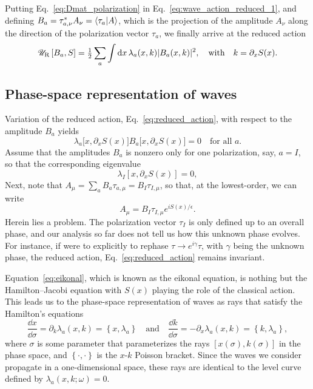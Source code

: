 Putting Eq.~\eqref{eq:Dmat_polarization} in Eq.~\eqref{eq:wave_action_reduced_1}, and defining $B_{a} = \tau_{a, \nu}^{*}A_{\nu} = \mathinner{\langle{\tau_{a}|A}\rangle}$, which is the projection of the amplitude $A_{\nu}$ along the direction of the polarization vector $\tau_{a}$, we finally arrive at the reduced action
%
\begin{equation}
  \mathscr{U}_{\text{R}}\left[B_{a}, S\right] = \tfrac{1}{2} \sum_{a} \int \mathrm{d}{x}\, \lambda_{a}(x,k) \lvert B_{a}(x, k)\rvert^{2},
  \quad\text{with}\quad
  k = \partial_{x}S(x).
  \label{eq:reduced_action}
\end{equation}

\subsection{Phase-space representation of waves}

Variation of the reduced action, Eq.~\eqref{eq:reduced_action}, with respect to the amplitude $B_{a}$ yields
%
\begin{equation}
  \lambda_{a}\big[x, \partial_{x}S(x)\big] B_{a}\big[x, \partial_{x}S(x)\big] = 0
  \quad\text{for all $a$}.
\end{equation}
%
Assume that the amplitudes $B_{a}$ is nonzero only for one polarization, say, $a = I$, so that the corresponding eigenvalue
%
\begin{equation}
  \lambda_{I}\left[x, \partial_{x}S(x)\right] = 0,
  \label{eq:eikonal}
\end{equation}
%
Next, note that $A_{\mu} = \sum_{a} B_{a} \tau_{a,\mu} = B_{I}\tau_{I,\mu}$, so that, at the lowest-order, we can write
%
\begin{equation}
  A_{\mu} = B_{I}\tau_{I,\mu}e^{iS(x)/\epsilon}.
\end{equation}
%
Herein lies a problem.
The polarization vector $\tau_{I}$ is only defined up to an overall phase, and our analysis so far does not tell us how this unknown phase evolves.
For instance, if were to explicitly to rephase $\tau \to e^{i\gamma}\tau$, with $\gamma$ being the unknown phase, the reduced action, Eq.~\eqref{eq:reduced_action} remains invariant.

Equation~\eqref{eq:eikonal}, which is known as the eikonal equation, is nothing but the Hamilton--Jacobi equation with $S(x)$ playing the role of the classical action.
 This leads us to the phase-space representation of waves as rays that satisfy the Hamilton's equations
%
\begin{equation}
  \frac{\dd{x}}{\dd{\sigma}} = \partial_{k}\lambda_{a}(x, k) = \left\{x, \lambda_{a}\right\}
  \quad\text{and}\quad
  \frac{\dd{k}}{\dd{\sigma}} = -\partial_{x}\lambda_{a}(x, k) = \left\{k, \lambda_{a}\right\},
\end{equation}
%
where $\sigma$ is some parameter that parameterizes the rays $[x(\sigma), k(\sigma)]$ in the phase space, and $\left\{\cdot, \cdot\right\}$ is the $x$-$k$ Poisson bracket.
Since the waves we consider propagate in a one-dimensional space, these rays are identical to the level curve defined by $\lambda_{a}(x, k; \omega) = 0$.

